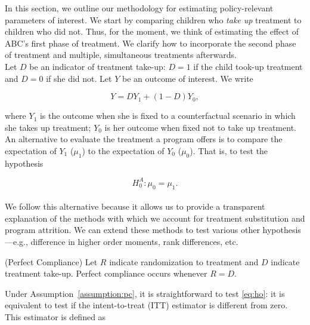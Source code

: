\noindent In this section, we outline our methodology for estimating policy-relevant parameters of interest. We start by comparing children who \textit{take up} treatment to children who did not. Thus, for the moment, we think of estimating the effect of ABC's first phase of treatment. We clarify how to incorporate the second phase of treatment and multiple, simultaneous treatments afterwards.\\

\noindent Let $D$ be an indicator of treatment take-up: $D = 1$ if the child took-up treatment and $D=0$ if she did not. Let $Y$ be an outcome of interest. We write

\begin{equation}
Y = D Y_{1} + \left( 1 - D \right) Y_{0}, 
\end{equation}

\noindent where $Y_{1}$  is the outcome when she is fixed to a counterfactual scenario in which she takes up treatment; $Y_{0}$ is her outcome when fixed not to take up treatment.\\

\noindent An alternative to evaluate the treatment a program offers is to compare the expectation of $Y_{1}$ ($\mu_{1}$) to the expectation of $Y_{0}$ ($\mu_{0}$). That is, to test the hypothesis 

\begin{equation}
H_{0}^A: \mu_{0} = \mu_{1}. \label{eq:ho}
\end{equation}\\

\noindent We follow this alternative because it allows us to provide a transparent explanation of the methods with which we account for treatment substitution and program attrition. We can extend these methods to test various other hypothesis---e.g., difference in higher order moments, rank differences, etc.\\

\noindent \begin{assumption} \label{assumption:pc} \normalfont (Perfect Compliance) Let $R$ indicate randomization to treatment and $D$ indicate treatment take-up. Perfect compliance occurs whenever  $R = D$.\end{assumption}

\noindent Under Assumption~\ref{assumption:pc}, it is straightforward to test \eqref{eq:ho}: it is equivalent to test if the intent-to-treat (ITT) estimator is different from zero. This estimator is defined as 

